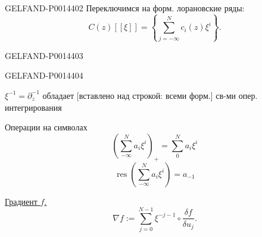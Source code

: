 \begin{GelfandAdjacentEvidence}{GELFAND-P001440}{2}
Переключимся на форм. лорановские ряды:
\begin{equation*}
C(z)[[\xi]]=\left\{\sum_{j=-\infty}^{N}c_i(z)\xi^i\right\}. \tag{6}
\end{equation*}
\end{GelfandAdjacentEvidence}
\begin{GelfandAdjacentEvidence}{GELFAND-P001440}{3}

\end{GelfandAdjacentEvidence}
\begin{GelfandAdjacentEvidence}{GELFAND-P001440}{4}


\(\xi^{-1}=\partial_z^{-1}\) обладает [вставлено над строкой: всеми форм.] св-ми опер. интегрирования
\end{GelfandAdjacentEvidence}


Операции на символах
\begin{equation*}
\left(\sum_{-\infty}^{N}a_i\xi^i\right)_+=\sum_0^N a_i\xi^i \tag{7}
\end{equation*}
\begin{equation*}
\operatorname{res}\left(\sum_{-\infty}^{N}a_i\xi^i\right)=a_{-1} \tag{8}
\end{equation*}

\uline{Градиент \(f\).}
\begin{equation*}
\nabla f:=\sum_{j=0}^{N-1}\xi^{-j-1}\circ\frac{\delta f}{\delta u_j}. \tag{9}
\end{equation*}


